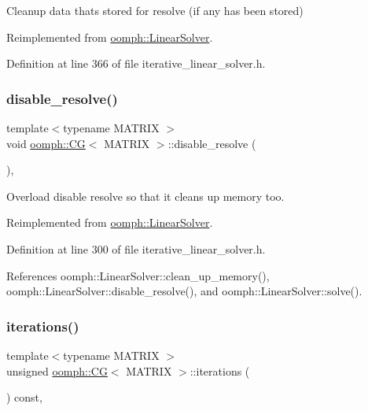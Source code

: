 Cleanup data that\textquotesingle{}s stored for resolve (if any has been stored) 



Reimplemented from \hyperlink{classoomph_1_1LinearSolver_a9d66f3262e80ca06a365f98216afd85f}{oomph\+::\+Linear\+Solver}.



Definition at line 366 of file iterative\+\_\+linear\+\_\+solver.\+h.

\mbox{\label{classoomph_1_1CG_a1116011340fabc5c5d2a97cea0cd5b72}} 
\subsubsection{\texorpdfstring{disable\+\_\+resolve()}{disable\_resolve()}}
{\footnotesize\ttfamily template$<$typename M\+A\+T\+R\+IX $>$ \\
void \hyperlink{classoomph_1_1CG}{oomph\+::\+CG}$<$ M\+A\+T\+R\+IX $>$\+::disable\+\_\+resolve (\begin{DoxyParamCaption}{ }\end{DoxyParamCaption})\hspace{0.3cm}{\ttfamily [inline]}, {\ttfamily [virtual]}}



Overload disable resolve so that it cleans up memory too. 



Reimplemented from \hyperlink{classoomph_1_1LinearSolver_ad61c63af94c5961830bd9807225a48d6}{oomph\+::\+Linear\+Solver}.



Definition at line 300 of file iterative\+\_\+linear\+\_\+solver.\+h.



References oomph\+::\+Linear\+Solver\+::clean\+\_\+up\+\_\+memory(), oomph\+::\+Linear\+Solver\+::disable\+\_\+resolve(), and oomph\+::\+Linear\+Solver\+::solve().

\mbox{\label{classoomph_1_1CG_a17db796814dc11cb67eac960df85d5f7}} 
\subsubsection{\texorpdfstring{iterations()}{iterations()}}
{\footnotesize\ttfamily template$<$typename M\+A\+T\+R\+IX $>$ \\
unsigned \hyperlink{classoomph_1_1CG}{oomph\+::\+CG}$<$ M\+A\+T\+R\+IX $>$\+::iterations (\begin{DoxyParamCaption}{ }\end{DoxyParamCaption}) const\hspace{0.3cm}{\ttfamily [inline]}, {\ttfamily [virtual]}}



